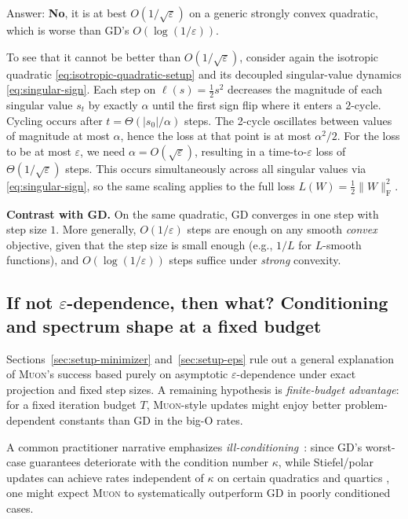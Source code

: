 \documentclass{article}
\theoremstyle{plain}
\theoremstyle{definition}
\theoremstyle{remark}
\newcommand{\loss}{L}
\newcommand{\stepsize}{\alpha}
\newcommand{\sv}{{s}} %
\newcommand{\GD}{\textsc{GD}}
\newcommand{\Muon}{\textsc{Muon}}
\newcommand{\eps}{\varepsilon}
\begin{document}
Answer: \textbf{No}, it is at best $O(1/\sqrt{\eps})$ on a generic strongly convex quadratic, which is worse than \GD{}'s $O(\log(1/\eps))$. 

To see that it cannot be better than $O(1/\sqrt{\eps})$, consider again the isotropic quadratic \eqref{eq:isotropic-quadratic-setup} and its decoupled singular-value dynamics \eqref{eq:singular-sign}. 
Each step on $\ell(\sv)=\frac12 \sv^2$ 
decreases the magnitude of each singular value 
$\sv_t$ 
by exactly $\stepsize$ until the first sign flip 
where it enters a $2$-cycle. 
Cycling occurs after $t=\Theta(|\sv_0|/\stepsize)$ steps. 
The 2-cycle oscillates between values of magnitude
at most $\stepsize$, 
hence the loss at that point is at most $\stepsize^2/2$. 
For the loss to be at most $\eps$, we need $\stepsize = O(\sqrt{\eps})$, resulting in a time-to-$\eps$ loss of $\Theta(1/\sqrt{\eps})$ steps. 
This occurs simultaneously across all singular values via \eqref{eq:singular-sign}, so the same scaling applies to the 
full loss $\loss(W)=\frac12\|W\|_{\mathrm{F}}^2$. 

\textbf{Contrast with \GD{}.}
On the same quadratic, \GD{}
converges in one step with step size $1$. 
More generally, $O(1/\eps)$ steps are enough on any smooth \emph{convex} objective, given that the step size is small enough (e.g., $1/L$ for $L$-smooth functions), and $O(\log(1/\eps))$ steps suffice under \emph{strong} convexity. 

\subsection{If not $\eps$-dependence, then what? Conditioning and spectrum shape at a fixed budget}
\label{sec:setup-conditioning}

Sections~\ref{sec:setup-minimizer} and~\ref{sec:setup-eps} rule out a general explanation of \Muon{}'s success based purely on asymptotic $\eps$-dependence under exact projection and fixed step sizes. 
A remaining hypothesis is \emph{finite-budget advantage}:
for a fixed iteration budget $T$, \Muon{}-style updates might enjoy better problem-dependent constants than \GD{} in the big-O rates. 


A common practitioner narrative emphasizes \emph{ill-conditioning}~\cite{jordan2024muon}:
since \GD{}'s worst-case guarantees deteriorate with the condition number $\kappa$,
while Stiefel/polar updates can achieve rates independent of $\kappa$ 
on certain quadratics and quartics \cite{ma2026preconditioningbenefitsspectralorthogonalization}, 
one might expect \Muon{} to systematically outperform \GD{} in poorly conditioned cases.
\end{document}
